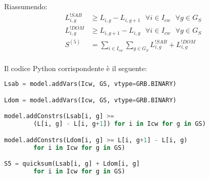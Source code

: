 Riassumendo:
\begin{equation}
\begin{split}
L_{i, g}^{!SAB} &\geq L_{i, g} - L_{i, g+1}  ~~~ \forall i \in I_{cw} ~~~ \forall g \in G_S \\
L_{i, g}^{!DOM} &\geq L_{i, g+1} - L_{i, g} ~~~ \forall i \in I_{cw} ~~~ \forall g \in G_S \\
S^{(5)} &= \sum_{i \in I_{cw}} \sum_{g \in G_S} L_{i, g}^{!SAB} + L_{i, g}^{!DOM} \\
\end{split}
\end{equation}

Il codice Python corrispondente è il seguente:
\begin{lstlisting}[language=Python]
Lsab = model.addVars(Icw, GS, vtype=GRB.BINARY)

Ldom = model.addVars(Icw, GS, vtype=GRB.BINARY)

model.addConstrs(Lsab[i, g] >= 
		(L[i, g] - L[i, g+1]) for i in Icw for g in GS)

model.addConstrs(Ldom[i, g] >= L[i, g+1] - L[i, g) 
		for i in Icw for g in GS)

S5 = quicksum(Lsab[i, g] + Ldom[i, g] 
		for i in Icw for g in GS)
\end{lstlisting}

